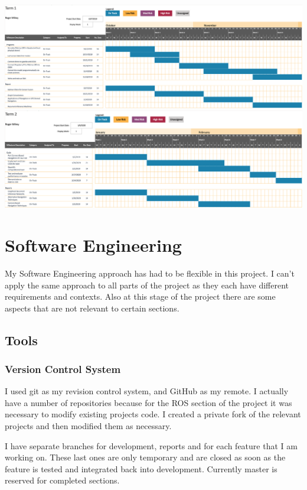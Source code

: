 \documentclass[]{../resources/final_report}
\begin{document}
\includegraphics[width=\textwidth]{../resources/images/Term1GanttChart.png}
\includegraphics[width=\textwidth]{../resources/images/Term2GanttChart.png}

\chapter{Software Engineering}

My Software Engineering approach has had to be flexible in this project. I can't apply the same approach to all parts of the project as they each have different requirements and contexts.
Also at this stage of the project there are some aspects that are not relevant to certain sections.

\section{Tools}

\subsection{Version Control System}
I used git as my revision control system, and GitHub as my remote. I actually have a number of repositories because for the ROS section of the project it was necessary to modify existing projects code.
I created a private fork of the relevant projects and then modified them as necessary.

I have separate branches for development, reports and for each feature that I am working on. These last ones are only temporary and are closed as soon as the feature is tested and integrated back into development.
Currently master is reserved for completed sections.
\end{document}
